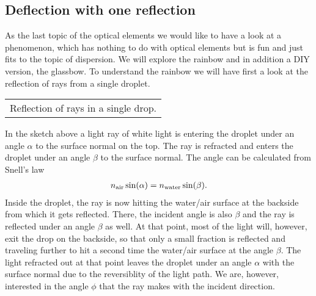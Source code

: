 \documentclass[letterpaper,10pt,english]{sphinxmanual}
\begin{document}
\subsection{Deflection with one reflection}
\label{\detokenize{notebooks/L4/Rainbow:Deflection-with-one-reflection}}
As the last topic of the optical elements we would like to have a look at a phenomenon, which has nothing to do with optical elements but is fun and just fits to the topic of dispersion. We will explore the rainbow and in addition a DIY version, the glassbow. To understand the rainbow we will have first a look at the reflection of rays from a single droplet.


\begin{savenotes}\sphinxattablestart
\centering
\begin{tabulary}{\linewidth}[t]{|T|}
\hline
\sphinxstyletheadfamily 
{}
\\
\hline
{} Reflection of rays in a single drop.
\\
\hline
\end{tabulary}
\par
\sphinxattableend\end{savenotes}

In the sketch above a light ray of white light is entering the droplet under an angle \(\alpha\) to the surface normal on the top. The ray is refracted and enters the droplet under an angle \(\beta\) to the surface normal. The angle can be calculated from Snell’s law
\begin{equation*}
\begin{split}n_{\rm air}\sin(\alpha)=n_{\rm water}\sin(\beta).\end{split}
\end{equation*}
Inside the droplet, the ray is now hitting the water/air surface at the backside from which it gets reflected. There, the incident angle is also \(\beta\) and the ray is reflected under an angle \(\beta\) as well. At that point, most of the light will, however, exit the drop on the backside, so that only a small fraction is reflected and traveling further to hit a second time the water/air surface at the angle \(\beta\). The light refracted out at that point leaves the droplet under
an angle \(\alpha\) with the surface normal due to the reversiblity of the light path. We are, however, interested in the angle \(\phi\) that the ray makes with the incident direction.
\end{document}
